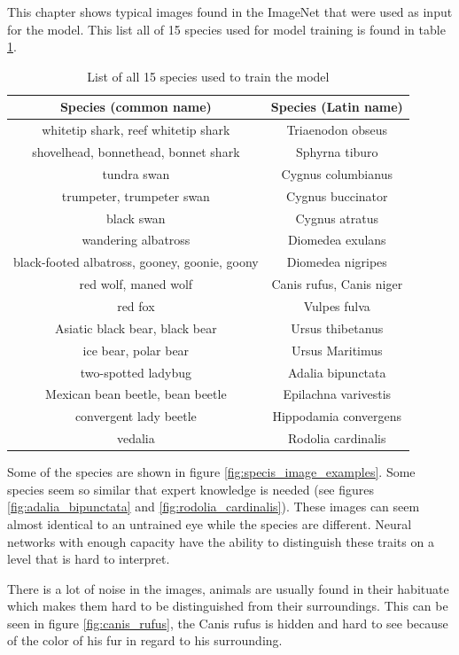 \documentclass[times, utf8, diplomski]{fer}
\begin{document}
This chapter shows typical images found in the ImageNet that were used as input for the model. This list all of 15 species used for model training is found in table \ref{tb:species_list}.

\begin{table}
\centering
\caption{List of all 15 species used to train the model}
\label{tb:species_list}
\begin{tabular}{cc}
\hline 
Species (common name) & Species (Latin name)\\ \hline 
whitetip shark, reef whitetip shark & Triaenodon obseus \\
shovelhead, bonnethead, bonnet shark & Sphyrna tiburo \\
tundra swan & Cygnus columbianus \\
trumpeter, trumpeter swan & Cygnus buccinator \\
black swan & Cygnus atratus \\
wandering albatross & Diomedea exulans \\
black-footed albatross, gooney, goonie, goony & Diomedea nigripes \\
red wolf, maned wolf & Canis rufus, Canis niger \\
red fox & Vulpes fulva \\
Asiatic black bear, black bear & Ursus thibetanus\\
ice bear, polar bear & Ursus Maritimus \\
two-spotted ladybug & Adalia bipunctata \\
Mexican bean beetle, bean beetle & Epilachna varivestis \\
convergent lady beetle & Hippodamia convergens \\
vedalia & Rodolia cardinalis \\
\hline 
\end{tabular} 
\end{table}

Some of the species are shown in figure \ref{fig:specis_image_examples}. Some species seem so similar that expert knowledge is needed (see figures \ref{fig:adalia_bipunctata} and \ref{fig:rodolia_cardinalis}). These images can seem almost identical to an untrained eye while the species are different. Neural networks with enough capacity have the ability to distinguish these traits on a level that is hard to interpret.

There is a lot of noise in the images, animals are usually found in their habituate which makes them hard to be distinguished from their surroundings. This can be seen in figure \ref{fig:canis_rufus}, the Canis rufus is hidden and hard to see because of the color of his fur in regard to his surrounding.
\end{document}
